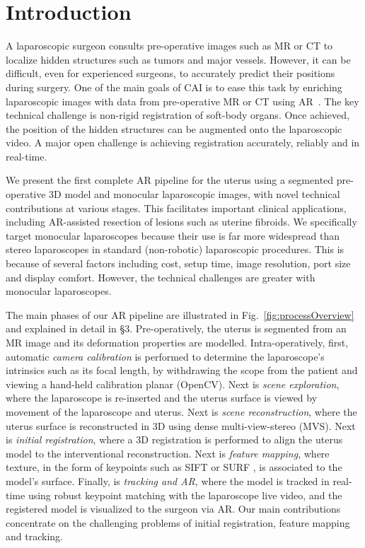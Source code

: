 
\section{Introduction}
A laparoscopic surgeon consults pre-operative images such as MR or CT to localize hidden  structures such as tumors and major vessels. However, it can be difficult, even for experienced surgeons, to accurately predict their positions during surgery. 
One of the main goals of CAI is to ease this task by enriching laparoscopic images with data from pre-operative MR or CT using AR~\cite{1732,8714}. 
The key technical challenge is non-rigid registration of soft-body organs. Once achieved, the position of the hidden structures can be augmented onto the laparoscopic video. A major open challenge is achieving registration accurately, reliably and in real-time. 

We present the first complete AR pipeline for the uterus using a segmented pre-operative 3D model and monocular laparoscopic images, with novel technical contributions at various stages. This facilitates important clinical applications, including AR-assisted resection of lesions such as uterine fibroids. We specifically target monocular laparoscopes because their use is far more widespread than stereo laparoscopes in standard (non-robotic) laparoscopic procedures. This is because of several factors including
cost, setup time, image resolution, port size
and display comfort. However, the technical challenges are  greater with monocular laparoscopes. 

The main phases of our AR pipeline are illustrated in Fig.~\ref{fig:processOverview} and explained in detail in \S3. Pre-operatively, the uterus is segmented from an MR image and its deformation properties are modelled. Intra-operatively, first, automatic \emph{camera calibration} is performed to determine the laparoscope's intrinsics such as its focal length, by withdrawing the scope from the patient and viewing a hand-held calibration planar  (OpenCV). Next is \emph{scene exploration}, where the laparoscope is re-inserted and the uterus surface is viewed by movement of the laparoscope and uterus. Next is \emph{scene reconstruction}, where the uterus surface is reconstructed in 3D using dense multi-view-stereo (MVS). Next is \emph{initial registration}, where a 3D registration is performed to align the uterus model to the interventional reconstruction. Next is \emph{feature mapping}, where texture, in the form of keypoints such as SIFT \cite{Lowe:2004:DIF:993451.996342} or SURF \cite{SURF}, is associated to the model's surface. Finally, is \emph{tracking and AR}, where the model is tracked in real-time using robust keypoint matching with the laparoscope live video, and the registered model is visualized to the surgeon via AR. Our main contributions concentrate on the challenging problems of initial registration, feature mapping and tracking. 

